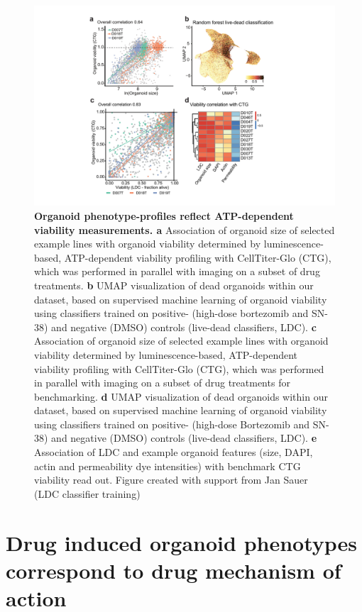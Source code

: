 \begin{flushleft}
\clearpage
\begin{figure}[h]
\centering
\includegraphics[width=\textwidth,
                height=\textheight,
                keepaspectratio]{figures/promise/pdf/fig_2_3.pdf}
\caption{\textbf{Organoid phenotype-profiles reflect ATP-dependent viability measurements. a} Association of organoid size of selected example lines with organoid viability determined by luminescence-based, ATP-dependent viability profiling with CellTiter-Glo (CTG), which was performed in parallel with imaging on a subset of drug treatments. \textbf{b} UMAP visualization of dead organoids within our dataset, based on supervised machine learning of organoid viability using classifiers trained on positive- (high-dose bortezomib and SN-38) and negative (DMSO) controls (live-dead classifiers, LDC). \textbf{c} Association of organoid size of selected example lines with organoid viability determined by luminescence-based, ATP-dependent viability profiling with CellTiter-Glo (CTG), which was performed in parallel with imaging on a subset of drug treatments for benchmarking. \textbf{d} UMAP visualization of dead organoids within our dataset, based on supervised machine learning of organoid viability using classifiers trained on positive- (high-dose Bortezomib and SN-38) and negative (DMSO) controls (live-dead classifiers, LDC). \textbf{e} Association of LDC and example organoid features (size, DAPI, actin and permeability dye intensities) with benchmark CTG viability read out. Figure created with support from Jan Sauer (LDC classifier training)}
\label{fig_223}
\end{figure}
\bigbreak

\section{Drug induced organoid phenotypes correspond to drug mechanism of action}


\end{flushleft}
